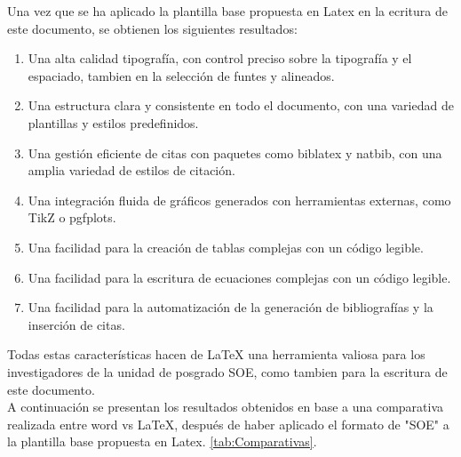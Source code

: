 \documentclass[10pt]{article}
\begin{document}
Una vez que se ha aplicado la plantilla base propuesta en Latex en la ecritura de este documento, se obtienen los siguientes resultados:
    \begin{enumerate}
        \item Una alta calidad tipografía, con control preciso sobre la tipografía y el espaciado, tambien en la selección de funtes y alineados.
        \item Una estructura clara y consistente en todo el documento, con una variedad de plantillas y estilos predefinidos.
        \item Una gestión eficiente de citas con paquetes como biblatex y natbib, con una amplia variedad de estilos de citación.
        \item Una integración fluida de gráficos generados con herramientas externas, como TikZ o pgfplots.
        \item Una facilidad para la creación de tablas complejas con un código legible.
        \item Una facilidad para la escritura de ecuaciones complejas con un código legible.
        \item Una facilidad para la automatización de la generación de bibliografías y la inserción de citas.
    \end{enumerate}
Todas estas características hacen de LaTeX una herramienta valiosa para los investigadores de la unidad de posgrado SOE, como tambien para la escritura de este documento.\\
A continuación se presentan los resultados obtenidos en base a una comparativa realizada entre word vs LaTeX, después de haber aplicado el formato de "SOE" a la plantilla base propuesta en Latex.  \ref{tab:Comparativas}.
\end{document}
